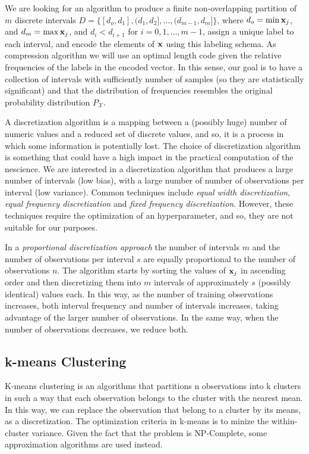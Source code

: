 We are looking for an algorithm to produce a finite non-overlapping partition of $m$ discrete intervals $D=\{ [d_o, d_1], (d_1, d_2], \ldots, (d_{m-1}, d_m] \}$, where $d_o = \min{\bold{x}_j}$, and $d_m = \max{\bold{x}_j}$, and $d_i < d_{i+1}$ for $i = 0, 1, \ldots, m-1$, assign a unique label to each interval, and encode the elements of $\bold{x}$ using this labeling schema. As compression algorithm we will use an optimal length code given the relative frequencies of the labels in the encoded vector. In this sense, our goal is to have a collection of intervals with sufficiently number of samples (so they are statistically significant) and that the distribution of frequencies resembles the original probability distribution $P_\mathcal{X}$.

A discretization algorithm is a mapping between a (possibly huge) number of numeric values and a reduced set of discrete values, and so, it is a process in which some information is potentially lost. The choice of discretization algorithm is something that could have a high impact in the practical computation of the nescience. We are interested in a discretization algorithm that produces a large number of intervals (low bias), with a large number of number of observations per interval (low variance). Common techniques include \emph{equal width discretization}, \emph{equal frequency discretization} and \emph{fixed frequency discretization}. However, these techniques require the optimization of an hyperparameter, and so, they are not suitable for our purposes.

In a \emph{proportional discretization approach} the number of intervals $m$ and the number of observations per interval $s$ are equally proportional to the number of observations $n$. The algorithm starts by sorting the values of $\bold{x}_j$ in ascending order and then discretizing them into $m$ intervals of approximately $s$ (possibly identical) values each. In this way, as the number of training observations increases, both interval frequency and number of intervals increases, taking advantage of the larger number of observations. In the same way, when the number of observations decreases, we reduce both.

\subsection{k-means Clustering}
\label{sec:kmeans_clustering}

K-means clustering is an algorithms that partitions n observations into k clusters in such a way that each observation belongs to the cluster with the nearest mean. In this way, we can replace the observation that belong to a cluster by its means, as a discretization. The optimization criteria in k-means is to minize the within-cluster variance. Given the fact that the problem is NP-Complete, some approximation algorithms are used instead.

